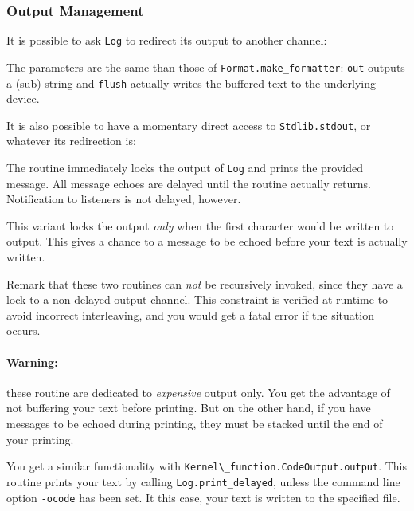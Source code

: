 \subsubsection{Output Management}

It is possible to ask \lstinline{Log} to redirect its output to
another channel:
\begin{description}
  The parameters are the same than those of
  \lstinline{Format.make_formatter}: \lstinline{out} outputs a
  (sub)-string and \lstinline{flush} actually writes the buffered
  text to the underlying device.
\end{description}

It is also possible to have a momentary direct access to
\lstinline{Stdlib.stdout}, or whatever its redirection is:
\begin{description}
  The routine immediately locks the output of \lstinline{Log} and
  prints the provided message. All message echoes are delayed until
  the routine actually returns. Notification to listeners is not
  delayed, however.

  This variant locks the output \emph{only} when the first character
  would be written to output. This gives a chance to a message to be echoed before
  your text is actually written.
\end{description}

Remark that these two routines can \emph{not} be recursively invoked,
since they have a lock to a non-delayed output channel. This
constraint is verified at runtime to avoid incorrect interleaving, and
you would get a fatal error if the situation occurs.

\paragraph{Warning:} these routine are dedicated to \emph{expensive}
output only. You get the advantage of not buffering your text before
printing. But on the other hand, if you have messages to be echoed
during printing, they must be stacked until the end of your printing.

%
%
You get a similar functionality with
\lstinline{Kernel\_function.CodeOutput.output}. This routine prints your
text by calling \lstinline{Log.print_delayed}, unless the command
line option \texttt{-ocode} has been set. It this case, your text is
written to the specified file.

